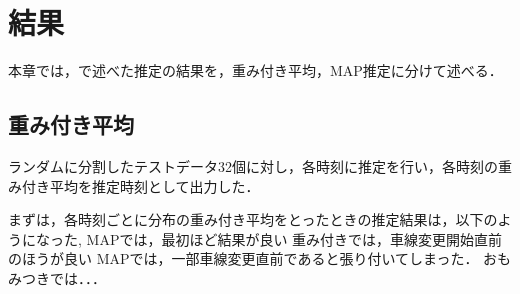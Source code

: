 \chapter{結果}
本章では，で述べた推定の結果を，重み付き平均，MAP推定に分けて述べる．
\section{重み付き平均}
ランダムに分割したテストデータ32個に対し，各時刻に推定を行い，各時刻の重み付き平均を推定時刻として出力した．


まずは，各時刻ごとに分布の重み付き平均をとったときの推定結果は，以下のようになった,
MAPでは，最初ほど結果が良い
重み付きでは，車線変更開始直前のほうが良い
MAPでは，一部車線変更直前であると張り付いてしまった．
おもみつきでは．．．
